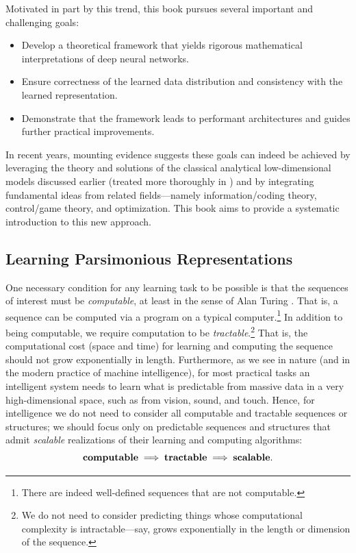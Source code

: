 \documentclass[../../book-main.tex]{subfiles}
\begin{document}
Motivated in part by this trend, this book pursues several important
and challenging goals:
\begin{itemize}
    \item Develop a theoretical framework that yields rigorous
        mathematical interpretations of deep neural networks.
    \item Ensure correctness of the learned data distribution and
        consistency with the learned representation.
    \item Demonstrate that the framework leads to performant
        architectures and guides further practical improvements.
\end{itemize}
In recent years, mounting evidence suggests these goals can indeed be
achieved by leveraging the theory and solutions of the classical
analytical low-dimensional models discussed earlier (treated more
thoroughly in ) and by integrating fundamental ideas
from related fields---namely information/coding theory, control/game
theory, and optimization. This book aims to provide a systematic
introduction to this new approach.

\subsection{Learning Parsimonious Representations}
\label{sec:computational-approach-compression}
One necessary condition for any learning task to be possible is that
the sequences of interest must be \textit{computable}, at least in
the sense of Alan Turing \cite{Turing-1936}. That is, a sequence can
be computed via a program on a typical computer.\footnote{There are
indeed well-defined sequences that are not computable.} In addition
to being computable, we require computation to be
\textit{tractable}.\footnote{We do not need to consider predicting
    things whose computational complexity is intractable---say, grows
exponentially in the length or dimension of the sequence.} That is,
the computational cost (space and time) for learning and computing
the sequence should not grow exponentially in length. Furthermore, as
we see in nature (and in the modern practice of machine
intelligence), for most practical tasks an intelligent system needs
to learn what is predictable from massive data in a very
high-dimensional space, such as from vision, sound, and touch. Hence,
for intelligence we do not need to consider all computable and
tractable sequences or structures; we should focus only on
predictable sequences and structures that admit \textit{scalable}
realizations of their learning and computing algorithms:
\begin{equation}
    \text{\textbf{computable}} \;
    \Longrightarrow \; \text{\textbf{tractable}} \; \Longrightarrow \;
    \text{\textbf{scalable}}.
\end{equation}
\end{document}
